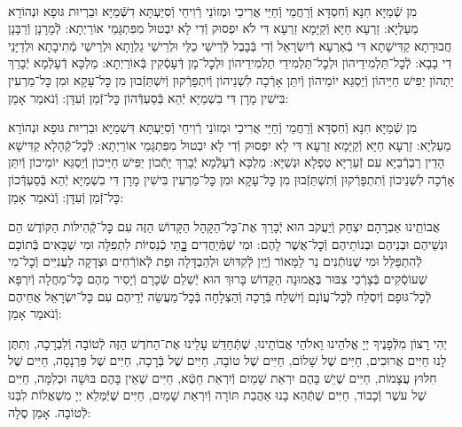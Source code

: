 \documentclass[twoside, openany, parskip=half, 11pt]{book}
\begin{document}

\shabbos\\
 מִן שְֿׁמַיָּא חִנָּא וְֿחִסְדָּא וְֿרַחֲמֵי וְֿחַיֵּי אֲרִיכֵי וּמְזוֹנֵי רְֿוִיחֵי וְֿסִיַּעְתָּא דִשְּֿׁמַיָּא וּבַרְיוּת גּוּפָא וּנְהוֹרָא מַעַלְיָא: זַרְעָא חַיָּא וְֿקַיָּמָא זַרְעָא דִּי לֹא יִפְסוּק וְֿדִי לָא יִבְטוּל מִפִּתְגָּמֵי אוֹרַיְתָא: לְֿמָרָנָן וְֿרַבָּנָן חֲבוּרָתָא קַדִּישָׁתָא דִּי בְֿאַרְעָא דְֿיִשְׂרָאֵל וְֿדִי בְּֿבָבֶל לְֿרֵישֵׁי כַלֵּי וּלְרֵישֵׁי גַלְוָתָא וּלְרֵישֵׁי מְֿתִיבָתָא וּלְדַיָּנֵי דִי בָבָא: לְֿכׇל־תַּלְמִידֵיהוֹן וּלְכׇל־תַּלְמִידֵי תַלְמִידֵיהוֹן וּלְכׇל־מָן דְּֿעָסְֿקִין בְּֿאוֹרַיְתָא: מַלְכָּא דְֿעָלְֿמָא יְֿבָרֵךְ יַתְהוֹן יַפִּישׁ חַיֵּיהוֹן וְֿיַסְגֵּא יוֹמֵיהוֹן וְֿיִתֵּן אָרְֿכָה לִשְׁנֵיהוֹן וְֿיִתְפָּרְֿקוּן וְֿיִשְׁתֵּזְֿבוּן מִן כׇּל־עָקָא וּמִן כׇּל־מַרְעִין בִּישִׁין מָרָן דִּי בִשְׁמַיָּא יְֿהֵא בְּֿסַעְדְּֿהוֹן כׇּל־זְֿמַן וְֿעִדָּן: וְֿנֹאמַר אָמֵן:



 מִן שְֿׁמַיָּא חִנָּא וְֿחִסְדָּא וְֿרַחֲמֵי וְֿחַיֵּי אֲרִיכֵי וּמְזוֹנֵי רְֿוִיחֵי וְֿסִיַּעְתָּא דִּשְׁמַיָּא וּבַרְיוּת גּוּפָא וּנְהוֹרָא מַעַלְיָא: זַרְעָא חַיָּא וְֿקַיָּמָא זַרְעָא דִּי לָא יִפְסוּק וְֿדִי לָא יִבְטוּל מִפִּתְגָּמֵי אוֹרַיְתָא: לְֿכׇל־קְֿהָלָא קַדִּישָׁא הָדֵין רַבְרְֿבַיָּא עִם זְֿעֵרַיָּא טַפְלָא וּנְשַׁיָּא: מַלְכָּא דְֿעָלְֿמָא יְֿבָרֵךְ יָתְֿכוֹן יַפִּישׁ חַיֵּיכוֹן וְֿיַסְגֵּא יוֹמֵיכוֹן וְֿיִתֵּן אָרְֿכָה לִשְׁנֵיכוֹן וְֿתִתְפָּרְֿקוּן וְֿתִשְׁתֵּזְֿבוּן מִן כׇּל־עָקָא וּמִן כׇּל־מַרְעִין בִּישִׁין מָרָן דִּי בִשְׁמַיָּא יְֿהֵא בְּֿסַעְדְּֿכוֹן כׇּל־זְֿמַן וְֿעִדָּן: וְֿנֹאמַר אָמֵן:

 אֲבוֹתֵֽינוּ אַבְרָהָם יִצְחָק וְֿיַעֲקֹב הוּא יְֿבָרֵךְ אֶת־כׇּל־הַקָּהָל הַקָּדוֹשׁ הַזֶּה עִם כׇּל־קְֿהִילּוֹת הַקּוֹדֶשׁ הֵם וּנְשֵׁיהֶם וּבְנֵיהֶם וּבְנוֹתֵיהֶם וְֿכׇל־אֲשֶׁר לָהֶם: וּמִי שֶׁמְּֿיַחֲדִים בׇׇׇׇָּתֵּי כְֿנֵסִיּוֹת לִתְפִלָּה וּמִי שֶׁבָּאִים בְּֿתוֹכָם לְֿהִתְפַּלֵּל וּמִי שֶׁנּוֹתְֿנִים נֵר לַמָּאוֹר וְֿיַֽיִן לְֿקִדּוּשׁ וּלְהַבְדָּלָה וּפַת לְֿאוֹרְֿחִים וּצְדָקָה לַעֲנִיִּים וְֿכׇל־מִי שֶׁעוֹסְֿקִים בְּֿצָרְֿכֵי צִבּוּר בֶּאֱמוּנָה הַקָּדוֹשׁ בָּרוּךְ הוּא יְֿשַׁלֵם שְֿׂכָרָם וְֿיָסִיר מֵהֶם כׇּל־מַחֲלָה וְֿיִרְפָּא לְֿכׇל־גּוּפָם וְֿיִסְלַח לְֿכׇל־עֲוֹנָם וְֿיִשְׁלַח בְּֿרָכָה וְֿהַצְלָחָה בְּֿכׇל־מַעֲשֵׂה יְֿדֵיהֶם עִם כָּל־יִשְׂרָאֵל אֲחֵיהֶם וְֿנֹאמַר אָמֵן:







יְהִי רָצוֹן מִלְּֿפָנֶיךָ יְיָ אֱלֹהֵינוּ וֵאלֹהֵי אֲבוֹתֵינוּ,
שֶׁתְּֿחַדֵּשׁ עָלֵינוּ אֶת־הַחֹדֶשׁ הַזֶּה לְֿטוֹבָה וְֿלִבְרָכָה,
וְתִתֶּן לָנוּ חַיִּים אֲרוּכִים,
חַיִּים שֶׁל שָׁלוֹם,
חַיִּים שֶׁל טוֹבָה,
חַיִּים שֶׁל בְּֿרָכָה,
חַיִּים שֶׁל פַּרְנָסָה,
חַיִּים שֶׁל חִלּוּץ עֲצָמוֹת,
חַיִּים שֶׁיֵשׁ בָּהֶם יִרְאַת שָׁמַיִם וְֿיִרְאַת חֵטְֿא,
חַיִּים שֶׁאֵין בָּהֶם בּוּשָׁה וּכְלִמָּה,
חַיִּים שֶׁל עשֶׁר וְֿכָבוֹד,
חַיִּים שֶׁתְּֿהֵא בָנוּ אַהֲבַת תּוֹרָה וְֿיִרְאַת שָׁמַיִם,
חַיִּים שֶׁיְּֿמַּלֵא יְיָ מִשְׁאֲלוֹת לִבֵּנוּ לְֿטוֹבָה. אָמֵן סֶלָה:
\end{document}
